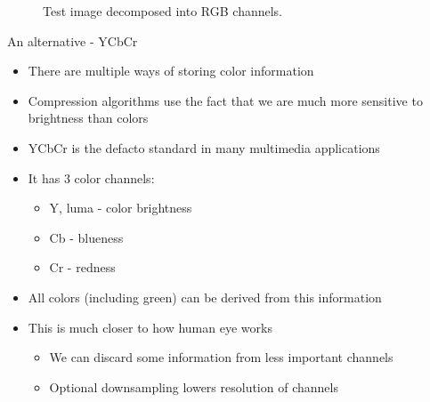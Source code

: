 \documentclass[10pt,aspectratio=169]{beamer}
\begin{document}
\begin{frame}[c,plain]
\begin{figure}
	\caption{Test image decomposed into RGB channels.}
\end{figure}
\end{frame}

\begin{frame}[plain]{An alternative - YCbCr}
	\begin{itemize}
		\item There are multiple ways of storing color information
		\item Compression algorithms use the fact that we are much more sensitive to brightness than colors
		\item YCbCr is the defacto standard in many multimedia applications
		\item It has 3 color channels:
		\begin{itemize}
			\item Y, luma - color brightness
			\item Cb - blueness
			\item Cr - redness
		\end{itemize}
		\item All colors (including green) can be derived from this information
		\item This is much closer to how human eye works
		\begin{itemize}
			\item We can discard some information from less important channels
			\item Optional downsampling lowers resolution of channels
		\end{itemize}
	\end{itemize}
\end{frame}
\end{document}
